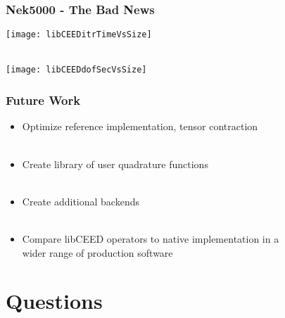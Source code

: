\documentclass{beamer}
\begin{document}

\begin{frame}
\begin{center}
\frametitle{Nek5000 - The Bad News}

\begin{multicols}{2}

\texttt{[image: libCEEDitrTimeVsSize]}

~\\

\texttt{[image: libCEEDdofSecVsSize]}

\end{multicols}

\end{center}
\end{frame}


\begin{frame}
\begin{center}
\frametitle{Future Work}

\begin{itemize}

\item Optimize reference implementation, tensor contraction\\

~\\

\item Create library of user quadrature functions\\

~\\

\item Create additional backends\\

~\\

\item Compare libCEED operators to native implementation in a\\ wider range of production software

\end{itemize}

\end{center}
\end{frame}

\section{Questions}
\end{document}
